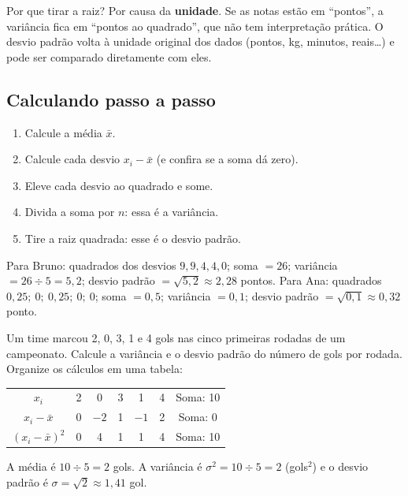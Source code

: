 Por que tirar a raiz? Por causa da \textbf{unidade}. Se as notas estão em “pontos”, a variância fica em
“pontos ao quadrado”, que não tem interpretação prática. O desvio padrão volta à unidade original
dos dados (pontos, kg, minutos, reais…) e pode ser comparado diretamente com eles.

\subsection{Calculando passo a passo}

\begin{enumerate}[nosep,leftmargin=1.6em,label=\textbf{\arabic*.}]
  \item Calcule a média $\bar{x}$.
  \item Calcule cada desvio $x_i - \bar{x}$ (e confira se a soma dá zero).
  \item Eleve cada desvio ao quadrado e some.
  \item Divida a soma por $n$: essa é a variância.
  \item Tire a raiz quadrada: esse é o desvio padrão.
\end{enumerate}

Para Bruno: quadrados dos desvios $9, 9, 4, 4, 0$; soma $= 26$; variância $= 26 \div 5 = 5{,}2$;
desvio padrão $= \sqrt{5{,}2} \approx 2{,}28$ pontos. Para Ana: quadrados $0{,}25;\ 0;\ 0{,}25;\ 0;\ 0$;
soma $= 0{,}5$; variância $= 0{,}1$; desvio padrão $= \sqrt{0{,}1} \approx 0{,}32$ ponto.

\begin{exemplo}
Um time marcou 2, 0, 3, 1 e 4 gols nas cinco primeiras rodadas de um campeonato. Calcule a variância e
o desvio padrão do número de gols por rodada.
\solucao
Organize os cálculos em uma tabela:
\begin{center}
\begin{tabular}{cccccc|c}
\toprule
$x_i$ & 2 & 0 & 3 & 1 & 4 & Soma: 10 \\
$x_i - \bar{x}$ & 0 & $-2$ & 1 & $-1$ & 2 & Soma: 0 \\
$(x_i - \bar{x})^2$ & 0 & 4 & 1 & 1 & 4 & Soma: 10 \\ \bottomrule
\end{tabular}
\end{center}
A média é $10 \div 5 = 2$ gols. A variância é $\sigma^2 = 10 \div 5 = 2$ (gols$^2$) e o desvio padrão é
$\sigma = \sqrt{2} \approx 1{,}41$ gol.
\end{exemplo}

